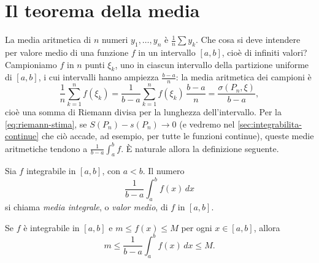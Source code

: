 \section{Il teorema della media}
\label{sec:media}

La media aritmetica di $n$ numeri $y_{1},\dots,y_{n}$ è $\frac1n\sum y_{k}$. Che cosa si
deve intendere per valore medio di una funzione $f$ in un intervallo $[a,b]$, cioè di
infiniti valori? Campioniamo $f$ in $n$ punti $\xi_{k}$, uno in ciascun intervallo della
partizione uniforme di $[a,b]$, i cui intervalli hanno ampiezza $\frac{b-a}n$: la media
aritmetica dei campioni è
\[
  \frac1n\sum_{k=1}^{n}f(\xi_{k})=\frac1{b-a}\sum_{k=1}^{n}f(\xi_{k})\,\frac{b-a}n
  =\frac{\sigma(P_{n},\xi)}{b-a} ,
\]
cioè una somma di Riemann divisa per la lunghezza dell'intervallo. Per la
\eqref{eq:riemann-stima}, se $S(P_{n})-s(P_{n})\to0$ (e vedremo nel
\cref{sec:integrabilita-continue} che ciò accade, ad esempio, per tutte le funzioni
continue), queste medie aritmetiche tendono a $\frac1{b-a}\int_{a}^{b}f$. È naturale
allora la definizione seguente.

\begin{definizione}\label{def:media-integrale}
Sia $f$ integrabile in $[a,b]$, con $a<b$. Il numero
\begin{equation}\label{eq:media-integrale}
  \frac1{b-a}\int_{a}^{b}f(x)\,dx
\end{equation}
si chiama \emph{media integrale}, o \emph{valor medio}, di $f$ in $[a,b]$.
\end{definizione}

\begin{proposizione}\label{prop:media-stima}
Se $f$ è integrabile in $[a,b]$ e $m\le f(x)\le M$ per ogni $x\in[a,b]$, allora
\begin{equation}\label{eq:media-stima}
  m\le\frac1{b-a}\int_{a}^{b}f(x)\,dx\le M .
\end{equation}
\end{proposizione}

\begin{schema}
\end{schema}

